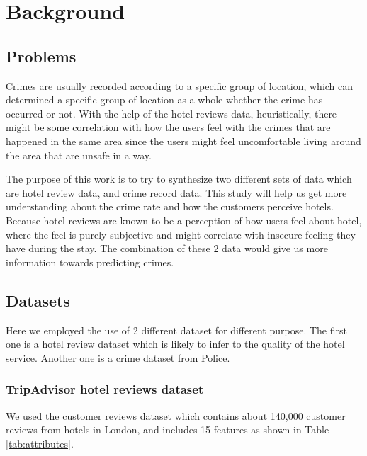 \documentclass[conference]{IEEEtran}
\begin{document}
\section{Background}

\subsection{Problems}
Crimes are usually recorded according to a specific group of location, which can determined a specific group of location as a whole whether the crime has occurred or not. With the help of the hotel reviews data, heuristically, there might be some correlation with how the users feel with the crimes that are happened in the same area since the users might feel uncomfortable living around the area that are unsafe in a way.

The purpose of this work is to try to synthesize two different sets of data which are hotel review data, and crime record data. This study will help us get more understanding about the crime rate and how the customers perceive hotels. Because hotel reviews are known to be a perception of how users feel about hotel, where the feel is purely subjective and might correlate with insecure feeling they have during the stay. The combination of these 2 data would give us more information towards predicting crimes.

\subsection{Datasets}\label{AA}
Here we employed the use of 2 different dataset for different purpose. The first one is a hotel review dataset which is likely to infer to the quality of the hotel service. Another one is a crime dataset from Police.

\subsubsection{TripAdvisor hotel reviews dataset}
We used the customer reviews dataset which contains about 140,000 customer reviews from hotels in London, and includes 15 features as shown in Table \ref{tab:attributes}.
\end{document}
